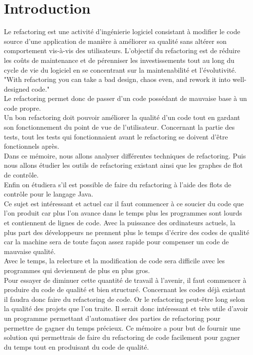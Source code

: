 \documentclass[a4paper,twoside,12pt,openright]{report}
\begin{document}
\section{Introduction}
Le refactoring est une activité d'ingénierie logiciel consistant à modifier le code source d'une application de manière à améliorer sa qualité sans altérer son comportement vis-à-vis des utilisateurs.
L'objectif du refactoring est de réduire les coûts de maintenance et de pérenniser les investissements tout au long du cycle de vie du logiciel en se concentrant sur la maintenabilité et l'évolutivité.\cite{ref1}\\
"With refactoring you can take a bad design, chaos even, and rework it into well-designed code."\cite{ref2}\\
Le refactoring permet donc de passer d'un code possédant de mauvaise base à un code propre.\\
Un bon refactoring doit pouvoir améliorer la qualité d'un code tout en gardant son fonctionnement du point de vue de l'utilisateur. Concernant la partie des tests, tout les tests qui fonctionnaient avant le refactoring se doivent d'être fonctionnels après.\\
Dans ce mémoire, nous allons analyser différentes techniques de refactoring. Puis nous allons étudier les outils de refactoring existant ainsi que les graphes de flot de contrôle.\\ Enfin on étudiera s'il est possible de faire du refactoring à l'aide des flots de contrôle pour le langage Java.\\
Ce sujet est intéressant et actuel car il faut commencer à ce soucier du code que l'on produit car plus l'on avance dans le temps plus les programmes sont lourds et contiennent de lignes de code. Avec la puissance des ordinateurs actuels, la plus part des développeurs ne prennent plus le temps d'écrire des codes de qualité car la machine sera de toute façon assez rapide pour compenser un code de mauvaise qualité.\cite{ref4}\\
Avec le temps, la relecture et la modification de code sera difficile avec les programmes qui deviennent de plus en plus gros.\cite{ref4}\\
Pour essayer de diminuer cette quantité de travail à l'avenir, il faut commencer à produire du code de qualité et bien structuré. Concernant les codes déjà existant il faudra donc faire du refactoring de code. Or le refactoring peut-être long selon la qualité des projets que l'on traite. Il serait donc intéressant et très utile d'avoir un programme permettant d'automatiser des parties de refactoring pour permettre de gagner du temps précieux. 
Ce mémoire a pour but de fournir une solution qui permettrais de faire du refactoring de code facilement pour gagner du temps tout en produisant du code de qualité.\cite{ref3}
\end{document}
